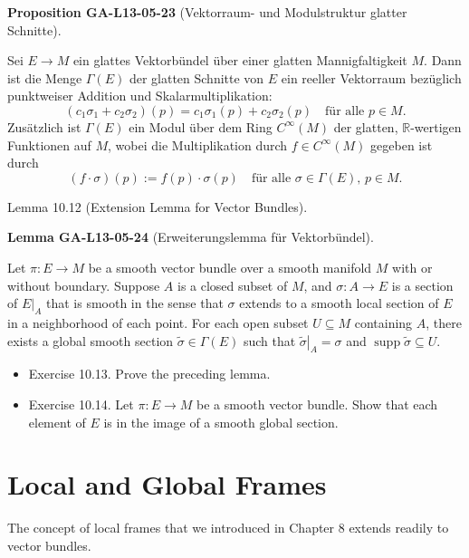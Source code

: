 \documentclass[10pt, letterpaper]{article}
\newcommand{\CustomHeading}[3]{%
  \par\medskip\noindent%
  \textbf{#1 #2} \textnormal{(#3)}.\enskip%
}
\newenvironment{PROP}[2]{\begin{unitbox}\CustomHeading{Proposition}{#1}{#2}}{\end{unitbox}}
\newenvironment{LEM}[2]{\begin{unitbox}\CustomHeading{Lemma}{#1}{#2}}{\end{unitbox}}
\begin{document}
\begin{PROP}{GA-L13-05-23}{Vektorraum- und Modulstruktur glatter Schnitte}
Sei \( E \rightarrow M \) ein glattes Vektorbündel über einer glatten Mannigfaltigkeit \( M \). Dann ist die Menge \( \Gamma(E) \) der glatten Schnitte von \( E \) ein reeller Vektorraum bezüglich punktweiser Addition und Skalarmultiplikation:
\[
(c_1 \sigma_1 + c_2 \sigma_2)(p) = c_1 \sigma_1(p) + c_2 \sigma_2(p) \quad \text{für alle } p \in M.
\]
Zusätzlich ist \( \Gamma(E) \) ein Modul über dem Ring \( C^\infty(M) \) der glatten, \(\mathbb{R}\)-wertigen Funktionen auf \( M \), wobei die Multiplikation durch \( f \in C^\infty(M) \) gegeben ist durch
\[
(f \cdot \sigma)(p) := f(p) \cdot \sigma(p) \quad \text{für alle } \sigma \in \Gamma(E),\, p \in M.
\]
\end{PROP}




Lemma 10.12 (Extension Lemma for Vector Bundles). 

\begin{LEM}{GA-L13-05-24}{Erweiterungslemma für Vektorbündel}
Let $\pi: E \rightarrow M$ be a smooth vector bundle over a smooth manifold $M$ with or without boundary. Suppose $A$ is a closed subset of $M$, and $\sigma: A \rightarrow E$ is a section of $\left.E\right|_{A}$ that is smooth in the sense that $\sigma$ extends to a smooth local section of $E$ in a neighborhood of each point. For each open subset $U \subseteq M$ containing $A$, there exists a global smooth section $\widetilde{\sigma} \in \Gamma(E)$ such that $\left.\widetilde{\sigma}\right|_{A}=\sigma$ and $\operatorname{supp} \widetilde{\sigma} \subseteq U$.
\begin{itemize}
  \item Exercise 10.13. Prove the preceding lemma.
  \item Exercise 10.14. Let $\pi: E \rightarrow M$ be a smooth vector bundle. Show that each element of $E$ is in the image of a smooth global section.
\end{itemize}
\end{LEM}



\section*{Local and Global Frames}



The concept of local frames that we introduced in Chapter 8 extends readily to vector bundles. 
\end{document}
